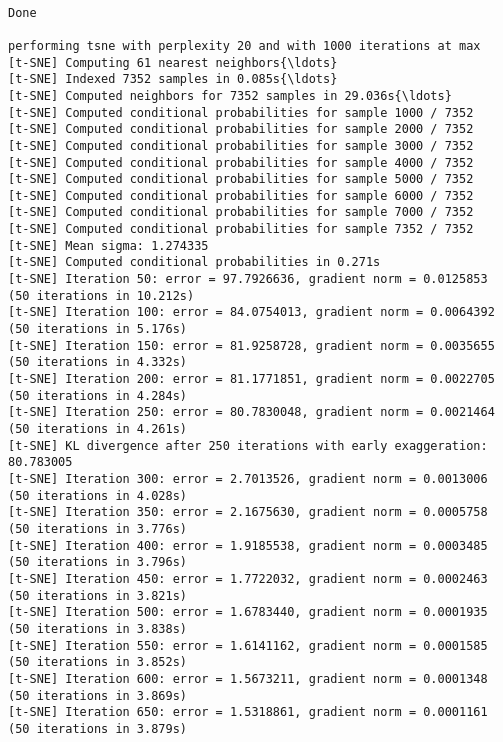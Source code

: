 \documentclass[11pt]{article}
\begin{document}
    \begin{center}
    \end{center}
    { \hspace*{\fill} \\}
    
    \begin{Verbatim}[commandchars=\\\{\}]
Done

performing tsne with perplexity 20 and with 1000 iterations at max
[t-SNE] Computing 61 nearest neighbors{\ldots}
[t-SNE] Indexed 7352 samples in 0.085s{\ldots}
[t-SNE] Computed neighbors for 7352 samples in 29.036s{\ldots}
[t-SNE] Computed conditional probabilities for sample 1000 / 7352
[t-SNE] Computed conditional probabilities for sample 2000 / 7352
[t-SNE] Computed conditional probabilities for sample 3000 / 7352
[t-SNE] Computed conditional probabilities for sample 4000 / 7352
[t-SNE] Computed conditional probabilities for sample 5000 / 7352
[t-SNE] Computed conditional probabilities for sample 6000 / 7352
[t-SNE] Computed conditional probabilities for sample 7000 / 7352
[t-SNE] Computed conditional probabilities for sample 7352 / 7352
[t-SNE] Mean sigma: 1.274335
[t-SNE] Computed conditional probabilities in 0.271s
[t-SNE] Iteration 50: error = 97.7926636, gradient norm = 0.0125853 (50 iterations in 10.212s)
[t-SNE] Iteration 100: error = 84.0754013, gradient norm = 0.0064392 (50 iterations in 5.176s)
[t-SNE] Iteration 150: error = 81.9258728, gradient norm = 0.0035655 (50 iterations in 4.332s)
[t-SNE] Iteration 200: error = 81.1771851, gradient norm = 0.0022705 (50 iterations in 4.284s)
[t-SNE] Iteration 250: error = 80.7830048, gradient norm = 0.0021464 (50 iterations in 4.261s)
[t-SNE] KL divergence after 250 iterations with early exaggeration: 80.783005
[t-SNE] Iteration 300: error = 2.7013526, gradient norm = 0.0013006 (50 iterations in 4.028s)
[t-SNE] Iteration 350: error = 2.1675630, gradient norm = 0.0005758 (50 iterations in 3.776s)
[t-SNE] Iteration 400: error = 1.9185538, gradient norm = 0.0003485 (50 iterations in 3.796s)
[t-SNE] Iteration 450: error = 1.7722032, gradient norm = 0.0002463 (50 iterations in 3.821s)
[t-SNE] Iteration 500: error = 1.6783440, gradient norm = 0.0001935 (50 iterations in 3.838s)
[t-SNE] Iteration 550: error = 1.6141162, gradient norm = 0.0001585 (50 iterations in 3.852s)
[t-SNE] Iteration 600: error = 1.5673211, gradient norm = 0.0001348 (50 iterations in 3.869s)
[t-SNE] Iteration 650: error = 1.5318861, gradient norm = 0.0001161 (50 iterations in 3.879s)

\end{Verbatim}
\end{document}
